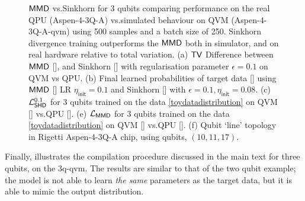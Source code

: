 \begin{figure}
\begin{subfigure}[t]{0.31\textwidth}
        \vskip 5pt
        \caption{}
        \label{subfig:3_qubit_topology_aspen_4_3q_a}
    \end{subfigure}
    \caption{$\operatorname{\textsf{MMD}}$ vs.\@ Sinkhorn for 3 qubits comparing performance on the real QPU ({\selectfont Aspen-4-3Q-A}) vs.\@ simulated behaviour on QVM ({\selectfont Aspen-4-3Q-A-qvm}) using 500 samples and a batch size of 250. Sinkhorn divergence training outperforms the $\operatorname{\textsf{MMD}}$ both in simulator, and on real hardware relative to total variation. (a) $\operatorname{\textsf{TV}}$ Difference between $\operatorname{\textsf{MMD}}$ [\crule[ForestGreen]{0.2cm}{0.2cm}], and Sinkhorn [\crule[blue]{0.2cm}{0.2cm}] with regularisation parameter $\epsilon = 0.1$ on QVM vs QPU. (b) Final learned probabilities of target data [\crule[black]{0.2cm}{0.2cm}] using $\operatorname{\textsf{MMD}}$ [\crule[ForestGreen]{0.2cm}{0.2cm}] LR $\eta_{\mathsf{init}} = 0.1$ and Sinkhorn [\crule[blue]{0.2cm}{0.2cm}] with $\epsilon = 0.1, \eta_{\mathsf{init}} = 0.08$. (c) $\mathcal{L}^{0.1}_{\operatorname{\textsf{SHD}}}$ for 3 qubits trained on the data \eqref{toydatadistribution} on QVM  [\crule[blue]{0.2cm}{0.2cm}] vs.\@ QPU  [\crule[cyan]{0.2cm}{0.2cm}]. (e) $\mathcal{L}_{\operatorname{\textsf{MMD}}}$ for 3 qubits trained on the data \eqref{toydatadistribution} on QVM  [\crule[ForestGreen]{0.2cm}{0.2cm}] vs.\@ QPU  [\crule[cyan]{0.2cm}{0.2cm}]. (f) Qubit `line' topology in Rigetti {\selectfont Aspen-4-3Q-A} chip, using qubits, $(10, 11, 17)$. }\label{fig:MMDvSinkvStein3_real}
\end{figure}

Finally,  illustrates the compilation procedure discussed in the main text for three qubits, on the {\selectfont 3q-qvm}. The results are similar to that of the two qubit example; the model is not able to learn \textit{the same} parameters as the target data, but it is able to mimic the output distribution.


